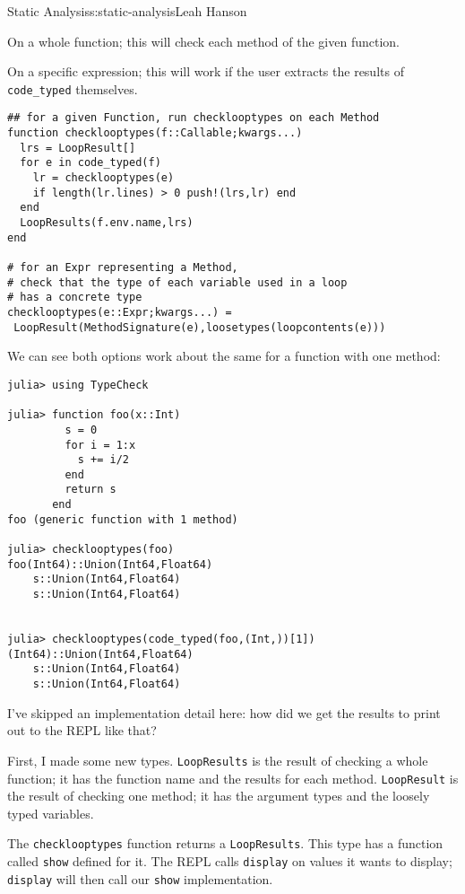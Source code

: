 \begin{aosachapter}{Static Analysis}{s:static-analysis}{Leah Hanson}
\begin{aosaenumerate}
\def\labelenumi{\arabic{enumi}.}
\item
  On a whole function; this will check each method of the given
  function.
\item
  On a specific expression; this will work if the user extracts the
  results of \texttt{code\_typed} themselves.
\end{aosaenumerate}

\begin{verbatim}
## for a given Function, run checklooptypes on each Method
function checklooptypes(f::Callable;kwargs...)
  lrs = LoopResult[]
  for e in code_typed(f)
    lr = checklooptypes(e)
    if length(lr.lines) > 0 push!(lrs,lr) end
  end
  LoopResults(f.env.name,lrs)
end

# for an Expr representing a Method,
# check that the type of each variable used in a loop
# has a concrete type
checklooptypes(e::Expr;kwargs...) = 
 LoopResult(MethodSignature(e),loosetypes(loopcontents(e)))
\end{verbatim}

We can see both options work about the same for a function with one
method:

\begin{verbatim}
julia> using TypeCheck

julia> function foo(x::Int)
         s = 0
         for i = 1:x
           s += i/2
         end
         return s
       end
foo (generic function with 1 method)

julia> checklooptypes(foo)
foo(Int64)::Union(Int64,Float64)
    s::Union(Int64,Float64)
    s::Union(Int64,Float64)


julia> checklooptypes(code_typed(foo,(Int,))[1])
(Int64)::Union(Int64,Float64)
    s::Union(Int64,Float64)
    s::Union(Int64,Float64)
\end{verbatim}

\label{pretty-printing}

I've skipped an implementation detail here: how did we get the results
to print out to the REPL like that?

First, I made some new types. \texttt{LoopResults} is the result of
checking a whole function; it has the function name and the results for
each method. \texttt{LoopResult} is the result of checking one method;
it has the argument types and the loosely typed variables.

The \texttt{checklooptypes} function returns a \texttt{LoopResults}.
This type has a function called \texttt{show} defined for it. The REPL
calls \texttt{display} on values it wants to display; \texttt{display}
will then call our \texttt{show} implementation.


\end{aosachapter}
